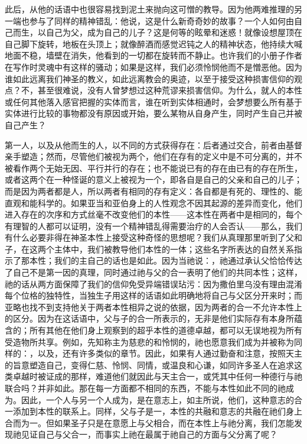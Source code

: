 此后，从他的话语中也很容易找到泥土来抛向这可憎的教导。因为他两难推理的另一端也参与了同样的精神错乱：他说，这是什么新奇奇妙的故事？一个人如何由自己而生，以自己为父，成为自己的儿子？这是何等的眩晕和迷惑！就像设想屋顶在自己脚下旋转，地板在头顶上；就像醉酒而感觉迟钝之人的精神状态，他持续大喊地面不稳，墙壁在消失，他看到的一切都在旋转而不静止。也许我们的小册子作者在写作时灵魂中有这样的骚动；如果是这样，我们必须怜悯他而不是憎恶他。因为谁如此远离我们神圣的教义，如此远离教会的奥迹，以至于接受这种损害信仰的观点？不，甚至很难说，没有人曾梦想过这种荒谬来损害信仰。为什么，就人的本性或任何其他落入感官把握的实体而言，谁在听到实体相通时，会梦想要么所有基于实体进行比较的事物都没有原因或开始，要么某物从自身产生，同时产生自己并被自己产生？\par

第一人，以及从他而生的人，以不同的方式获得存在：后者通过交合，前者由基督亲手塑造；然而，尽管他们被视为两个，他们在存有的定义中是不可分离的，并不被看作两个无始无因、平行并行的存在；也不能说已有的存在由已有的存在所生，或者这两个在一种怪诞的意义上被视为一个，即各自是自己的父亲和自己的儿子；而是因为两者都是人，所以两者有相同的存有定义：各自都是有死的、理性的、能直观和能科学的。如果亚当和亚伯身上的人性观念不因其起源的差异而变化，他们进入存在的次序和方式丝毫不改变他们的本性——这本性在两者中是相同的，每个有理智的人都可以证明，没有一个精神错乱得需要治疗的人会否认——那么，我们有什么必要非得在神圣本性上接受这种奇怪的思想呢？我们从真理那里听到了父和子，在这两个主体中，我们被教导他们本性的一体；这些名字所表达的自然关系指示了那本性；我们的主自己的话也是如此。因为当祂说：，祂通过承认父恰恰传达了自己不是第一因的真理，同时通过祂与父的合一表明了他们的共同本性；这样，祂的话从两方面保障了我们的信仰免受异端错误玷污：因为撒伯里乌没有理由混淆每个位格的独特性，当独生子用这样的话语如此明确地将自己与父区分开来时；而亚略也找不到支持他关于两者本性相异之说的依据，因为两者的合一不允许本性上的区分。因为在这话语中，父与子的合一所表示的，无非是他们实际存有本身所蕴含的；所有其他在他们身上观察到的超乎本性的道德卓越，都可以无误地视为所有受造物所共享。例如，先知称主为慈悲的和怜悯的，祂也愿意我们成为并被称为同样的：，以及，还有许多类似的章节。因此，如果有人通过勤奋和注意，按照天主的旨意塑造自己，变得仁慈、怜悯、同情，或温良和心谦，如同许多圣人在追求这类卓越时被证成的那样，难道他们就因此与天主合一，或凭其中任何一种德行与祂联合吗？并非如此。那在每一方面都不相同的东西，不能与本性如此不同的祂成为。因此，一个人与另一个人成为，是在意志上，如主所说，他们，这种意志的合一添加到本性的联系上。同样，父与子是一，本性的共融和意志的共融在祂们身上合而为一。但如果圣子只是在意愿上与父相合，而在本性上与祂分离，我们怎能发现祂见证自己与父合一，而事实上祂在最属于祂自己的方面与父分离了呢？\par

